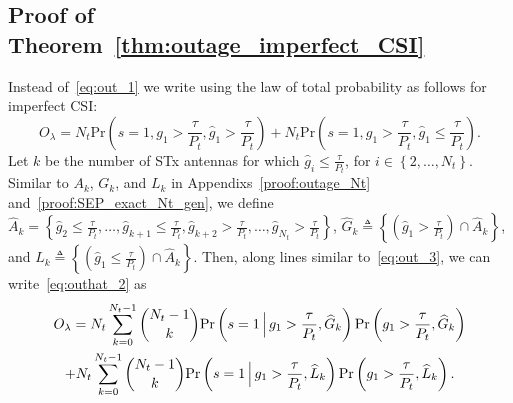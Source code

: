 \documentclass[12pt,draftcls,peerreview,onecolumn]{IEEEtran}
\newcommand{\brac}[1]{\left({#1}\right)}
\newcommand{\define}{\triangleq}
\newcommand{\prob}[1]{\text{Pr}\brac{#1}}
\newcommand{\Given}{\Big\arrowvert}
\newcommand{\nck}[2]{\binom{#1}{#2}}
\newcommand{\setA}{A}
\newcommand{\setAk}{\setA_{k}}
\newcommand{\setAkhat}{\widehat{\setA}_k}
\newcommand{\setG}{G}
\newcommand{\setL}{L}
\newcommand{\setGk}{\setG_k}
\newcommand{\setLk}{\setL_k}
\newcommand{\setGkhat}{\widehat{\setG}_k}
\newcommand{\setLkhat}{\widehat{\setL}_k}
\newcommand{\lam}{\lambda}
\newcommand{\Nt}{{N_t}}
\newcommand{\Pt}{{P_t}}
\newcommand{\puch}{g}
\newcommand{\gk}[1]{{\puch_{#1}}}
\newcommand{\itau}{\tau}
\newcommand{\out}{O}
\newcommand{\taubypt}{\frac{\itau}{\Pt}}
\newcommand{\gkgrtaubypt}[1]{{\gk{#1}}>\taubypt}
\newcommand{\gkhatgrtaubypt}[1]{{\gkhat{#1}}>\taubypt}
\newcommand{\gkhatlttaubypt}[1]{{\gkhat{#1}}\leq\taubypt}
\newcommand{\twoopts}{\left\{2,\ldots,\Nt\right\}}
\newcommand{\outlam}{\out_{\lam}}
\newcommand{\ghat}{\hat{\puch}}
\newcommand{\gkhat}[1]{\ghat_{#1}}
\begin{document}
\subsection{Proof of Theorem~\ref{thm:outage_imperfect_CSI}}
\label{proof:outage_imperfect_CSI}
Instead of~\eqref{eq:out_1} we write using the law of total probability as follows for imperfect CSI:
\begin{equation}
\outlam=\Nt\text{Pr}\brac{s=1,\gk{1}>\taubypt,\gkhat{1}>\taubypt} + \Nt\text{Pr}\brac{s=1,\gk{1}>\taubypt,\gkhat{1}\leq\taubypt}.
\label{eq:outhat_2}
\end{equation}
Let $k$ be the number of STx antennas for which $\gkhatlttaubypt{i}$, for $i\in\twoopts$. Similar to $\setAk$, $\setGk$, and $\setLk$ in Appendixs~\ref{proof:outage_Nt} and~\ref{proof:SEP_exact_Nt_gen}, we define $\setAkhat=\left\{\gkhatlttaubypt{2},\dots,\gkhatlttaubypt{k+1},\gkhatgrtaubypt{k+2},\dots,\gkhatgrtaubypt{\Nt}\right\}$, $\setGkhat\define\left\{\left(\gkhatgrtaubypt{1}\right)\cap\setAkhat \right\}$, and $\setLkhat\define\left\{\left(\gkhatlttaubypt{1}\right)\cap\setAkhat \right\}$. Then, along lines similar to~\eqref{eq:out_3}, we can write~\eqref{eq:outhat_2}  as
%
\begin{multline}
\outlam = \Nt\sum_{k=0}^{\Nt-1} \nck{\Nt-1}{k} 
\prob{s = 1 \Given\gkgrtaubypt{1}, \setGkhat } \prob{\gkgrtaubypt{1},\setGkhat}\\ + \Nt\sum_{k=0}^{\Nt-1}\nck{\Nt-1}{k}\prob{s = 1 \Given \gkgrtaubypt{1},\setLkhat} \prob{\gkgrtaubypt{1},\setLkhat}. 
\label{eq:pr_s_1_2_imp}
\end{multline}
%
\end{document}

